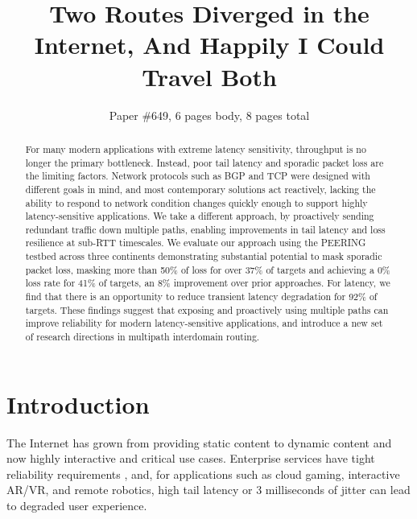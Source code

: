 \documentclass[sigconf,nonacm,screen,letterpaper,10pt]{acmart}
\title{Two Routes Diverged in the Internet, And Happily I Could Travel
Both}
\author{Paper \#649, 6 pages body, 8 pages total}
\date{}
\begin{document}
\begin{abstract}
For many modern applications with extreme latency sensitivity,
throughput is no longer the primary bottleneck. Instead, poor tail
latency and sporadic packet loss are the limiting factors. Network
protocols such as BGP and TCP were designed with different goals in
mind, and most contemporary solutions act reactively, lacking the
ability to respond to network condition changes quickly enough to
support highly latency-sensitive applications. We take a different
approach, by proactively sending redundant traffic down multiple paths,
enabling improvements in tail latency and loss resilience at sub-RTT
timescales. We evaluate our approach using the PEERING testbed across
three continents demonstrating substantial potential to mask sporadic
packet loss, masking more than 50\% of loss for over 37\% of targets and
achieving a 0\% loss rate for 41\% of targets, an 8\% improvement over
prior approaches. For latency, we find that there is an opportunity to
reduce transient latency degradation for 92\% of targets. These findings
suggest that exposing and proactively using multiple paths can improve
reliability for modern latency-sensitive applications, and introduce a
new set of research directions in multipath interdomain routing.
\end{abstract}

\maketitle


\setlength{\footskip}{40pt}



\hypertarget{introduction}{%
\section{Introduction}\label{introduction}}

\label{sec:introduction}

The Internet has grown from providing static content to dynamic content
and now highly interactive and critical use cases. Enterprise services
have tight reliability requirements \cite{painter,saving-private-wan},
and, for applications such as cloud gaming, interactive AR/VR, and
remote robotics, high tail latency \cite{augur} or 3 milliseconds of
jitter \cite{vr-jitter-test} can lead to degraded user experience.
\end{document}
